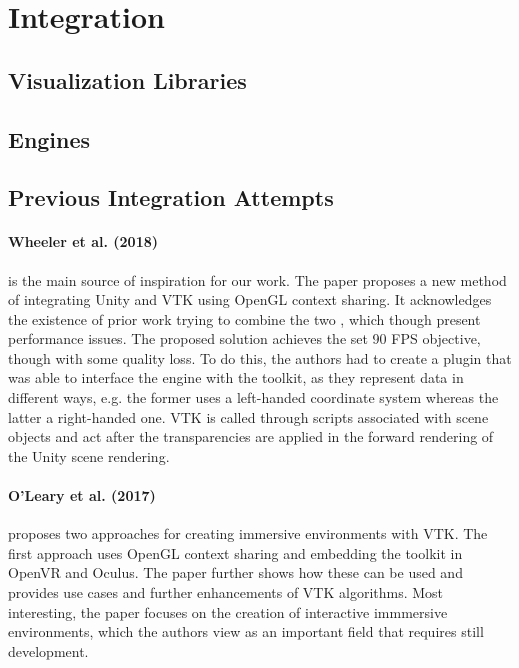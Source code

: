 \section{Integration}\label{sec:integration}



\subsection{Visualization Libraries}\label{sec:integration-visualization-libraries}



\subsection{Engines}\label{sec:integration-engines}



\subsection{Previous Integration Attempts}\label{sec:integration-previous-integration-attempts}

\paragraph{Wheeler et al. (2018) \cite{wheeler_virtual_2018}} is the main source of inspiration for our work. The paper proposes a new method of integrating Unity and VTK using OpenGL context sharing. It acknowledges the existence of prior work trying to combine the two \cite{noauthor_activiz_nodate, hanak_opengl_2003, tamura_intuitive_2016}, which though present performance issues. The proposed solution achieves the set 90 FPS objective, though with some quality loss. To do this, the authors had to create a plugin that was able to interface the engine with the toolkit, as they represent data in different ways, e.g. the former uses a left-handed coordinate system whereas the latter a right-handed one. VTK is called through scripts associated with scene objects and act after the transparencies are applied in the forward rendering of the Unity scene rendering.

\paragraph{O'Leary et al. (2017) \cite{oleary_enhancements_2017}} proposes two approaches for creating immersive environments with VTK. The first approach uses OpenGL context sharing and embedding the toolkit in OpenVR and Oculus. The paper further shows how these can be used and provides use cases and further enhancements of VTK algorithms. Most interesting, the paper focuses on the creation of interactive immmersive environments, which the authors view as an important field that requires still development.

